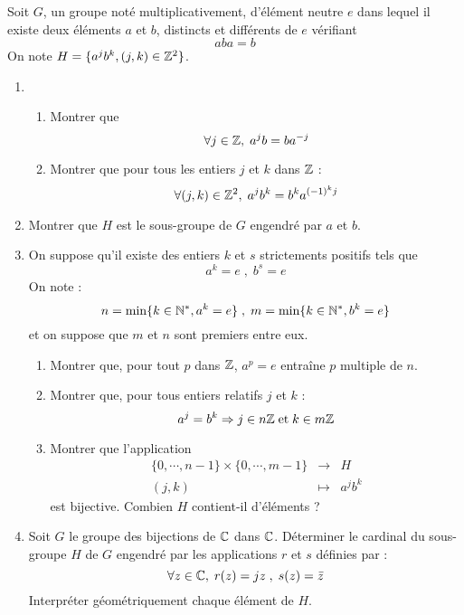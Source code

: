 Soit $G$, un groupe noté multiplicativement, d'élément neutre $e$ dans lequel il existe deux éléments $a$ et $b$, distincts et différents de $e$ vérifiant
\begin{displaymath}
  aba=b
\end{displaymath}
On note $H=\{a^j b^k ,(j,k)\in \mathbb{Z}^2\}$. 

\begin{enumerate}
\item \begin{enumerate}
\item Montrer que 
\begin{displaymath}
  \forall j\in \mathbb{Z}, \; a^j b = b a^{-j}
\end{displaymath}

\item Montrer que pour tous les entiers $j$ et $k$ dans $\mathbb{Z}$ :
\begin{displaymath}
  \forall (j,k)\in \mathbb{Z}^2, \; a^j b^k = b^k a^{(-1)^k j}
\end{displaymath}
\end{enumerate}

\item Montrer que $H$ est le sous-groupe de $G$ engendré par $a$ et $b$.
\item On suppose qu'il existe des entiers $k$ et $s$ strictements positifs tels que
\[a^k=e\; ,\; b^s=e\]
On note :
\[n=\min \{k\in \mathbb{N}^*,a^k=e\} \;,\;m=\min \{k\in \mathbb{N}^*,b^k=e\}\]
et on suppose que $m$ et $n$ sont premiers entre eux.
\begin{enumerate}
\item Montrer que, pour tout $p$ dans $\mathbb{Z}$, $a^p=e$ entraîne $p$ multiple de $n$.
\item Montrer que, pour tous entiers relatifs $j$ et $k$ :
\[a^j = b^k \Rightarrow j\in n\mathbb{Z} \; \mathrm{ et } \; k\in m\mathbb{Z}\]
\item Montrer que l'application 
\begin{eqnarray*}
\{0,\cdots,n-1\}\times \{0,\cdots,m-1\} &\rightarrow & H \\
(j,k) &\mapsto& a^j b^k
\end{eqnarray*}
est bijective. Combien $H$ contient-il d'éléments ?
\end{enumerate}
\item Soit $G$ le groupe des bijections de $\mathbb{C}$ dans $\mathbb{C}$. Déterminer le cardinal du sous-groupe $H$ de $G$ engendré par les applications $r$ et $s$ définies par :
\begin{displaymath}
  \forall z\in \mathbb{C}, \; r(z)=jz \;,\; s(z)=\bar{z}
\end{displaymath}
Interpréter géométriquement chaque élément de $H$.
\end{enumerate} 